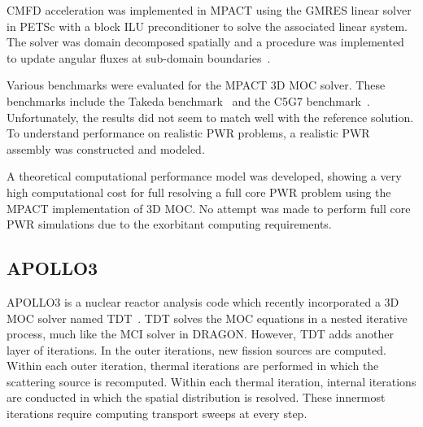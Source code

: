 

\ac{CMFD} acceleration was implemented in MPACT using the \ac{GMRES} linear solver in PETSc with a block ILU preconditioner to solve the associated linear system. The solver was domain decomposed spatially and a procedure was implemented to update angular fluxes at sub-domain boundaries~\cite{mpact_dd_cmfd}.

Various benchmarks were evaluated for the MPACT 3D \ac{MOC} solver. These benchmarks include the Takeda benchmark~\cite{takeda} and the C5G7 benchmark~\cite{c5g7}. Unfortunately, the results did not seem to match well with the reference solution. To understand performance on realistic \ac{PWR} problems, a realistic \ac{PWR} assembly was constructed and modeled. 

A theoretical computational performance model was developed, showing a very high computational cost for full resolving a full core \ac{PWR} problem using the MPACT implementation of 3D \ac{MOC}. No attempt was made to perform full core \ac{PWR} simulations due to the exorbitant computing requirements.

\subsection{APOLLO3}
\label{sec:apollo3}

APOLLO3 is a nuclear reactor analysis code which recently incorporated a 3D \ac{MOC} solver named TDT~\cite{Sciannandrone2016}. TDT solves the \ac{MOC} equations in a nested iterative process, much like the MCI solver in DRAGON. However, TDT adds another layer of iterations. In the outer iterations, new fission sources are computed. Within each outer iteration, thermal iterations are performed in which the scattering source is recomputed. Within each thermal iteration, internal iterations are conducted in which the spatial distribution is resolved. These innermost iterations require computing transport sweeps at every step. 

